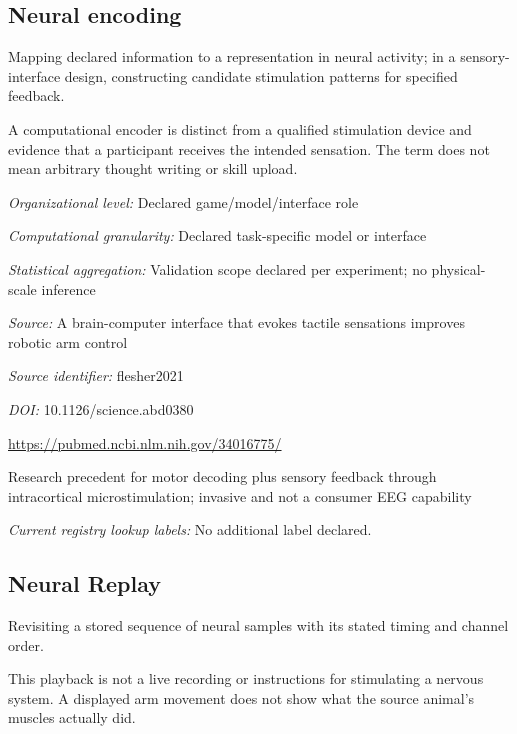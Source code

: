 \begin{samepage}
\subsection*{Neural encoding}
\noindent Mapping declared information to a representation in neural activity; in a sensory-interface design, constructing candidate stimulation patterns for specified feedback.\par
\end{samepage}
\noindent A computational encoder is distinct from a qualified stimulation device and evidence that a participant receives the intended sensation. The term does not mean arbitrary thought writing or skill upload.\par
\noindent\textit{Organizational level:} Declared game/model/interface role\par
\noindent\textit{Computational granularity:} Declared task-specific model or interface\par
\noindent\textit{Statistical aggregation:} Validation scope declared per experiment; no physical-scale inference\par
\noindent\textit{Source:} A brain-computer interface that evokes tactile sensations improves robotic arm control\par
\noindent\textit{Source identifier:} flesher2021\par
\noindent\textit{DOI:} 10.1126/science.abd0380\par
\noindent\url{https://pubmed.ncbi.nlm.nih.gov/34016775/}\par
\noindent Research precedent for motor decoding plus sensory feedback through intracortical microstimulation; invasive and not a consumer EEG capability\par


\noindent\textit{Current registry lookup labels:} No additional label declared.\par

\begin{samepage}
\subsection*{Neural Replay}
\noindent Revisiting a stored sequence of neural samples with its stated timing and channel order.\par
\end{samepage}
\begin{samepage}
\noindent This playback is not a live recording or instructions for stimulating a nervous system. A displayed arm movement does not show what the source animal’s muscles actually did.\par\nopagebreak[4]

\end{samepage}


